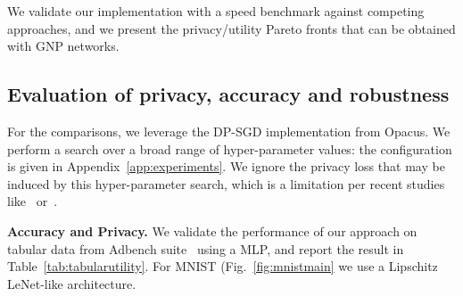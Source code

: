 We validate our implementation with a speed benchmark against competing approaches, and we present the privacy/utility Pareto fronts that can be obtained with GNP networks. 

\subsection{Evaluation of privacy, accuracy and robustness}

For the comparisons, we leverage the DP-SGD implementation from Opacus. We perform a search over a broad range of hyper-parameter values: the configuration is given in Appendix~\ref{app:experiments}. We ignore the privacy loss that may be induced by this hyper-parameter search, which is a limitation per recent studies like~\cite{papernot2022hyperparameter} or~. %

\textbf{Accuracy and Privacy.} We validate the performance of our approach on tabular data from Adbench suite~\citep{han2022adbench} using a MLP, and report the result in Table~\ref{tab:tabularutility}. For MNIST (Fig.~\ref{fig:mnistmain} we use a Lipschitz LeNet-like architecture.
 



